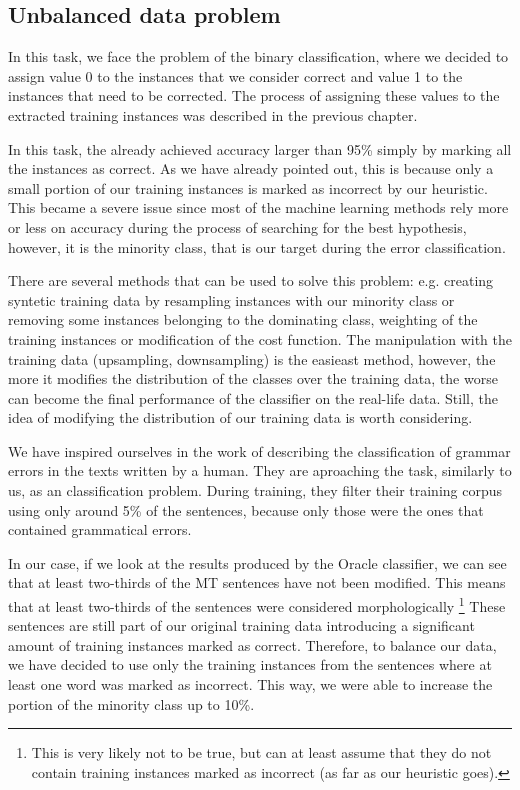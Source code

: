 \subsection{Unbalanced data problem}

In this task, we face the problem of the binary classification, where we decided
to assign value 0 to the instances that we consider correct and value 1 to the
instances that need to be corrected. The process of assigning these values to the
extracted training instances was described in the previous chapter. 

In this task, the  already achieved accuracy larger than 95\%
simply by marking all the instances as correct.
As we have already pointed out, this is because only a small portion of our
training instances is marked as incorrect by our heuristic.
This became a severe issue since most of the machine learning methods rely more or less on accuracy during
the process of searching for the best hypothesis, however, it is the minority
class, that is our target during the error classification.

There are several methods that can be used to solve this problem: e.g. creating syntetic
training data by resampling instances with our minority class or removing some instances
belonging to the dominating class, weighting of the training instances or modification of the
cost function. The manipulation with the training data (upsampling, downsampling) is the easieast method,
however, the more it modifies the distribution of the classes over the training data, the worse can become the final
performance of the classifier on the real-life data. Still, the idea of modifying the distribution
of our training data is worth considering.

We have inspired ourselves in the work of \citet{2013_Jia_CoNLL_GrammaticalError} describing the classification of grammar errors in the texts
written by a human. They are aproaching the task, similarly to us, as an classification
problem. During training, they filter their training corpus using only around 5\% of
the sentences, because only those were the ones that contained grammatical errors.

In our case, if we look at the results produced by the Oracle classifier, we can see that at least
two-thirds of the MT sentences have not been modified. This means that at least two-thirds of the sentences
were considered morphologically \footnote{This is very likely not to be true, but can at least assume
that they do not contain training instances marked as incorrect (as far as our heuristic goes).}
These sentences are still part of our original training data introducing a significant amount of training
instances marked as correct.
Therefore, to balance our data, we have decided to use only the training
instances from the sentences where at least one word was marked as incorrect. This way, we were
able to increase the portion of the minority class up to 10\%.

